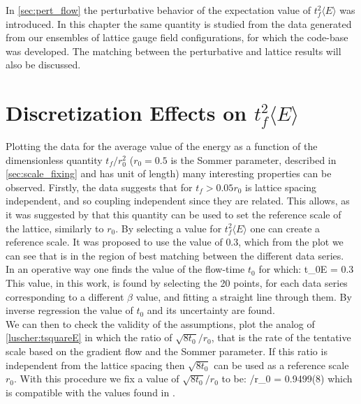 In \cref{sec:pert_flow} the perturbative behavior of the expectation value of $t_f^2\langle E \rangle$ was introduced. In this chapter the same quantity is studied from the data generated from our ensembles of lattice gauge field configurations, for which the code-base was developed. The matching between the perturbative and lattice results will also be discussed.

\section{Discretization Effects on $t_f^2\langle E \rangle$}
Plotting the data for the average value of the energy as a function of the dimensionless quantity $t_f/r_0^2$ ($r_0=0.5$ is the Sommer parameter, described in \cref{sec:scale_fixing} and has unit of length) many interesting properties can be observed.
Firstly, the data suggests that for $t_f > 0.05r_0$ is lattice spacing independent, and so coupling independent since they are related. This allows, as it was suggested by \cite{luscher_properties_2010} that this quantity can be used to set the reference scale of the lattice, similarly to $r_0$. By selecting a value for $t_f^2\langle E \rangle$ one can create a reference scale. It was proposed to use the value of $0.3$, which from the plot we can see that is in the region of best matching between the different data series.\\
In an operative way one finds the value of the flow-time $t_0$ for which:
\beq
    t_0\langle E \rangle = 0.3
\eeq
This value, in this work, is found by selecting the 20 points, for each data series corresponding to a different $\beta$ value, and fitting a straight line through them. By inverse regression the value of $t_0$ and its uncertainty are found.\\
We can then to check the validity of the assumptions, plot the analog of \cref{luscher:tsquareE} in which the ratio of $\sqrt{8t_0}/r_0$, that is the rate of the tentative scale based on the gradient flow and the Sommer parameter. If this ratio is independent from the lattice spacing then $\sqrt{8t_0}$ can be used as a reference scale $r_0$.
With this procedure we fix a value of $\sqrt{8t_0}/r_0$ to be:
\beq
{}/r_0 = 0.9499(8)
\eeq 
which is compatible with the values found in \CIT.

